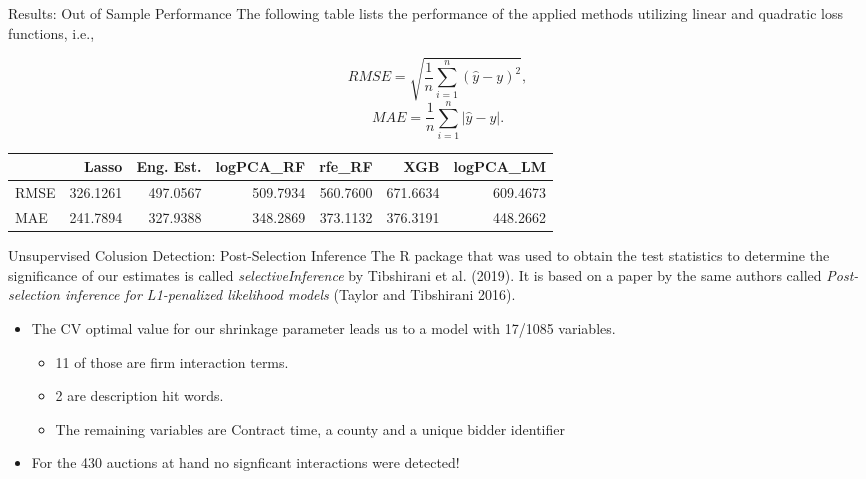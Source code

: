 \documentclass[
  11pt,
  ignorenonframetext,
]{beamer}
\providecommand{\tightlist}{%
  \setlength{\itemsep}{0pt}\setlength{\parskip}{0pt}}
\begin{document}
\begin{frame}{Results: Out of Sample Performance}
\protect\hypertarget{results-out-of-sample-performance-1}{}
The following table lists the performance of the applied methods
utilizing linear and quadratic loss functions, i.e.,

\[ RMSE = \sqrt{\frac{1}{n}\sum_{i = 1}^n (\hat{y} - y)^2} ,\]
\[  MAE = \frac{1}{n}\sum_{i = 1}^n |\hat{y} - y|. \]

\begin{table}
\centering\begingroup\fontsize{7}{9}\selectfont

\begin{tabular}{l|r|r|r|r|r|r}
\hline
  & Lasso & Eng. Est. & logPCA\_RF & rfe\_RF & XGB & logPCA\_LM\\
\hline
RMSE & 326.1261 & 497.0567 & 509.7934 & 560.7600 & 671.6634 & 609.4673\\
\hline
MAE & 241.7894 & 327.9388 & 348.2869 & 373.1132 & 376.3191 & 448.2662\\
\hline
\end{tabular}
\endgroup{}
\end{table}
\end{frame}

\begin{frame}{Unsupervised Colusion Detection: Post-Selection Inference}
\protect\hypertarget{unsupervised-colusion-detection-post-selection-inference}{}
The R package that was used to obtain the test statistics to determine
the significance of our estimates is called \textit{selectiveInference}
by Tibshirani et al. (2019). It is based on a paper by the same authors
called
\textit{Post-selection inference for L1-penalized likelihood models}
(Taylor and Tibshirani 2016).

\begin{itemize}
\tightlist
\item
  The CV optimal value for our shrinkage parameter leads us to a model
  with 17/1085 variables.

  \begin{itemize}
  \tightlist
  \item
    11 of those are firm interaction terms.
  \item
    2 are description hit words.
  \item
    The remaining variables are Contract time, a county and a unique
    bidder identifier
  \end{itemize}
\item
  For the 430 auctions at hand no signficant interactions were detected!
\end{itemize}
\end{frame}
\end{document}

